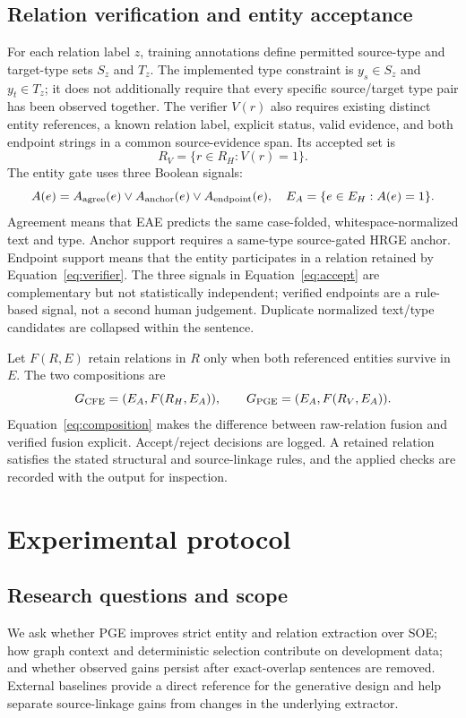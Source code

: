 \documentclass[preprint,12pt]{elsarticle}
\begin{document}
\subsection{Relation verification and entity acceptance}
For each relation label $z$, training annotations define permitted source-type
and target-type sets $S_z$ and $T_z$. The implemented type constraint is
$y_s\in S_z$ and $y_t\in T_z$; it does not additionally require that every
specific source/target type pair has been observed together. The verifier
$V(r)$ also requires existing distinct entity references, a known relation
label, explicit status, valid evidence, and both endpoint strings in a common
source-evidence span. Its accepted set is
\begin{equation}
R_V=\{r\in R_H:V(r)=1\}.
\label{eq:verifier}
\end{equation}
The entity gate uses three Boolean signals:
\begin{equation}
A(e)=A_{\rm agree}(e)\lor A_{\rm anchor}(e)\lor A_{\rm endpoint}(e),
\quad E_A=\{e\in E_H:A(e)=1\}.
\label{eq:accept}
\end{equation}
Agreement means that EAE predicts the same case-folded, whitespace-normalized
text and type. Anchor support requires a same-type source-gated HRGE anchor.
Endpoint support means that the entity participates in a relation retained by
Equation~\eqref{eq:verifier}. The three signals in Equation~\eqref{eq:accept}
are complementary but not statistically independent; verified endpoints are
a rule-based signal, not a second human judgement. Duplicate normalized
text/type candidates are collapsed within the sentence.

Let $F(R,E)$ retain relations in $R$ only when both referenced entities survive
in $E$. The two compositions are
\begin{equation}
G_{\rm CFE}=(E_A,F(R_H,E_A)),\qquad
G_{\rm PGE}=(E_A,F(R_V,E_A)).
\label{eq:composition}
\end{equation}
Equation~\eqref{eq:composition} makes the difference between raw-relation
fusion and verified fusion explicit. Accept/reject decisions are logged. A
retained relation satisfies the stated structural and source-linkage rules, and
the applied checks are recorded with the output for inspection.

\section{Experimental protocol}
\label{sec:experiment}
\subsection{Research questions and scope}
We ask whether PGE improves strict entity and relation extraction over SOE;
how graph context and deterministic selection contribute on development data;
and whether observed gains persist after exact-overlap sentences are removed.
External baselines provide a direct reference for the generative design and
help separate source-linkage gains from changes in the underlying extractor.
\end{document}
